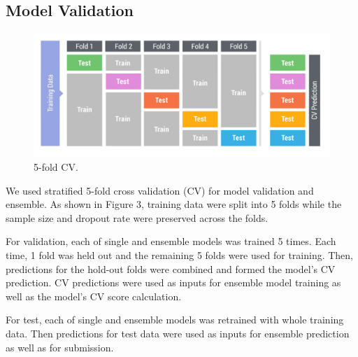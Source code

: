 \subsection{Model Validation}

\begin{figure}
  \centering
    \includegraphics[width=0.5 \textwidth]{cv}
    \caption{5-fold CV.}
\end{figure}

We used stratified 5-fold cross validation (CV) for model validation and ensemble.
As shown in Figure 3, training data were split into 5 folds while the sample size and dropout rate were preserved across the folds.

For validation, each of single and ensemble models was trained 5 times. Each time, 1 fold was held out and the remaining 5 folds were used for training. Then, predictions for the hold-out folds were combined and formed the model's CV prediction. CV predictions were used as inputs for ensemble model training as well as the model's CV score calculation.

For test, each of single and ensemble models was retrained with whole training data. Then predictions for test data were used as inputs for ensemble prediction as well as for submission. 

